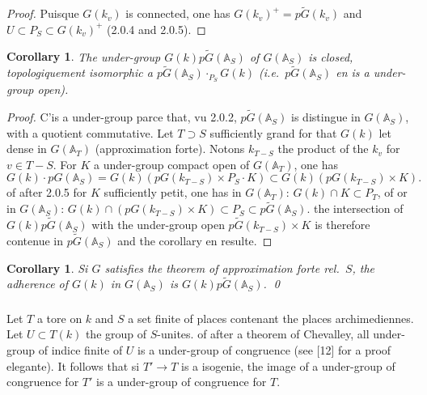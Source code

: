 \documentclass[12pt,a4paper]{article}
\theoremstyle{plain}
\newtheorem{corollary}[theorem]{Corollary}
\theoremstyle{definition}
\theoremstyle{remark}
\newcommand{\A}{\mathbb{A}}
\begin{document}
\begin{proof}
Puisque $G(k_v)$ is connected, one has $G(k_v)^+ = p\tilde{G}(k_v)$ and $U \subset P_S \subset G(k_v)^+$ (2.0.4 and 2.0.5).
\end{proof}

\begin{corollary}
The under-group $G(k)p\tilde{G}(\A_S)$ of $G(\A_S)$ is closed, topologiquement isomorphic a $p\tilde{G}(\A_S) \cdot_{P_S} G(k)$ (i.e.~$p\tilde{G}(\A_S)$ en is a under-group open).
\end{corollary}

\begin{proof}
C'is a under-group parce that, vu 2.0.2, $p\tilde{G}(\A_S)$ is distingue in $G(\A_S)$, with a quotient commutative. Let $T \supset S$ sufficiently grand for that $G(k)$ let dense in $G(\A_T)$ (approximation forte). Notons $k_{T-S}$ the product of the $k_v$ for $v \in T-S$. For $K$ a under-group compact open of $G(\A_T)$, one has
\[
G(k) \cdot pG(\A_S) = G(k)(pG(k_{T-S}) \times P_S \cdot K) \subset G(k)(pG(k_{T-S}) \times K).
\]
of after 2.0.5 for $K$ sufficiently petit, one has in $G(\A_T)$: $G(k) \cap K \subset P_T$, of or in $G(\A_S)$: $G(k) \cap (pG(k_{T-S}) \times K) \subset P_S \subset p\tilde{G}(\A_S)$. the intersection of $G(k)p\tilde{G}(\A_S)$ with the under-group open $p\tilde{G}(k_{T-S}) \times K$ is therefore contenue in $p\tilde{G}(\A_S)$ and the corollary en resulte.
\end{proof}

\begin{corollary}
Si $G$ satisfies the theorem of approximation forte rel.~$S$, the adherence of $G(k)$ in $G(\A_S)$ is $G(k)p\tilde{G}(\A_S)$.
\qed
\end{corollary}

\subsubsection{}

Let $T$ a tore on $k$ and $S$ a set finite of places contenant the places archimediennes. Let $U \subset T(k)$ the group of $S$-unites. of after a theorem of Chevalley, all under-group of indice finite of $U$ is a under-group of congruence (see [12] for a proof elegante). It follows that si $T' \to T$ is a isogenie, the image of a under-group of congruence for $T'$ is a under-group of congruence for $T$.

\subsubsection{}
\end{document}
